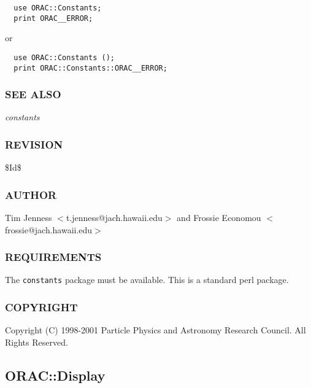 \begin{description}
\begin{verbatim}
  use ORAC::Constants;
  print ORAC__ERROR;
\end{verbatim}


or

\begin{verbatim}
  use ORAC::Constants ();
  print ORAC::Constants::ORAC__ERROR;
\end{verbatim}
\subsubsection*{SEE ALSO\label{ORAC::Constants_SEE_ALSO}}


\emph{constants}

\subsubsection*{REVISION\label{ORAC::Constants_REVISION}}


\$Id\$

\subsubsection*{AUTHOR\label{ORAC::Constants_AUTHOR}}


Tim Jenness $<$t.jenness@jach.hawaii.edu$>$ and
Frossie Economou $<$frossie@jach.hawaii.edu$>$

\subsubsection*{REQUIREMENTS\label{ORAC::Constants_REQUIREMENTS}}


The \texttt{constants} package must be available. This is a standard
perl package.

\subsubsection*{COPYRIGHT\label{ORAC::Constants_COPYRIGHT}}


Copyright (C) 1998-2001 Particle Physics and Astronomy Research
Council. All Rights Reserved.

\subsection{ORAC::Display\label{ORAC::Display}}



\end{description}
